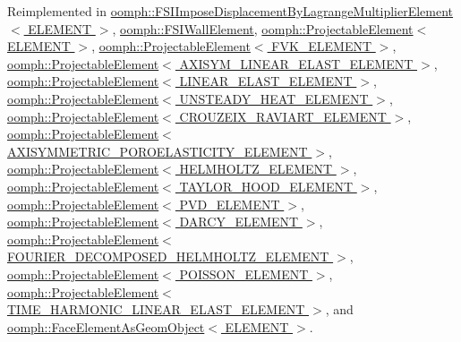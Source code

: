 Reimplemented in \hyperlink{classoomph_1_1FSIImposeDisplacementByLagrangeMultiplierElement_ad53849f509cfd0d3eb469bfacf7cfabf}{oomph\+::\+F\+S\+I\+Impose\+Displacement\+By\+Lagrange\+Multiplier\+Element$<$ E\+L\+E\+M\+E\+N\+T $>$}, \hyperlink{classoomph_1_1FSIWallElement_afe120348dddfc3acfd95e7d08c2d0a1d}{oomph\+::\+F\+S\+I\+Wall\+Element}, \hyperlink{classoomph_1_1ProjectableElement_a9e7e6d213f5e28d4b1e91433d4efb74c}{oomph\+::\+Projectable\+Element$<$ E\+L\+E\+M\+E\+N\+T $>$}, \hyperlink{classoomph_1_1ProjectableElement_a9e7e6d213f5e28d4b1e91433d4efb74c}{oomph\+::\+Projectable\+Element$<$ F\+V\+K\+\_\+\+E\+L\+E\+M\+E\+N\+T $>$}, \hyperlink{classoomph_1_1ProjectableElement_a9e7e6d213f5e28d4b1e91433d4efb74c}{oomph\+::\+Projectable\+Element$<$ A\+X\+I\+S\+Y\+M\+\_\+\+L\+I\+N\+E\+A\+R\+\_\+\+E\+L\+A\+S\+T\+\_\+\+E\+L\+E\+M\+E\+N\+T $>$}, \hyperlink{classoomph_1_1ProjectableElement_a9e7e6d213f5e28d4b1e91433d4efb74c}{oomph\+::\+Projectable\+Element$<$ L\+I\+N\+E\+A\+R\+\_\+\+E\+L\+A\+S\+T\+\_\+\+E\+L\+E\+M\+E\+N\+T $>$}, \hyperlink{classoomph_1_1ProjectableElement_a9e7e6d213f5e28d4b1e91433d4efb74c}{oomph\+::\+Projectable\+Element$<$ U\+N\+S\+T\+E\+A\+D\+Y\+\_\+\+H\+E\+A\+T\+\_\+\+E\+L\+E\+M\+E\+N\+T $>$}, \hyperlink{classoomph_1_1ProjectableElement_a9e7e6d213f5e28d4b1e91433d4efb74c}{oomph\+::\+Projectable\+Element$<$ C\+R\+O\+U\+Z\+E\+I\+X\+\_\+\+R\+A\+V\+I\+A\+R\+T\+\_\+\+E\+L\+E\+M\+E\+N\+T $>$}, \hyperlink{classoomph_1_1ProjectableElement_a9e7e6d213f5e28d4b1e91433d4efb74c}{oomph\+::\+Projectable\+Element$<$ A\+X\+I\+S\+Y\+M\+M\+E\+T\+R\+I\+C\+\_\+\+P\+O\+R\+O\+E\+L\+A\+S\+T\+I\+C\+I\+T\+Y\+\_\+\+E\+L\+E\+M\+E\+N\+T $>$}, \hyperlink{classoomph_1_1ProjectableElement_a9e7e6d213f5e28d4b1e91433d4efb74c}{oomph\+::\+Projectable\+Element$<$ H\+E\+L\+M\+H\+O\+L\+T\+Z\+\_\+\+E\+L\+E\+M\+E\+N\+T $>$}, \hyperlink{classoomph_1_1ProjectableElement_a9e7e6d213f5e28d4b1e91433d4efb74c}{oomph\+::\+Projectable\+Element$<$ T\+A\+Y\+L\+O\+R\+\_\+\+H\+O\+O\+D\+\_\+\+E\+L\+E\+M\+E\+N\+T $>$}, \hyperlink{classoomph_1_1ProjectableElement_a9e7e6d213f5e28d4b1e91433d4efb74c}{oomph\+::\+Projectable\+Element$<$ P\+V\+D\+\_\+\+E\+L\+E\+M\+E\+N\+T $>$}, \hyperlink{classoomph_1_1ProjectableElement_a9e7e6d213f5e28d4b1e91433d4efb74c}{oomph\+::\+Projectable\+Element$<$ D\+A\+R\+C\+Y\+\_\+\+E\+L\+E\+M\+E\+N\+T $>$}, \hyperlink{classoomph_1_1ProjectableElement_a9e7e6d213f5e28d4b1e91433d4efb74c}{oomph\+::\+Projectable\+Element$<$ F\+O\+U\+R\+I\+E\+R\+\_\+\+D\+E\+C\+O\+M\+P\+O\+S\+E\+D\+\_\+\+H\+E\+L\+M\+H\+O\+L\+T\+Z\+\_\+\+E\+L\+E\+M\+E\+N\+T $>$}, \hyperlink{classoomph_1_1ProjectableElement_a9e7e6d213f5e28d4b1e91433d4efb74c}{oomph\+::\+Projectable\+Element$<$ P\+O\+I\+S\+S\+O\+N\+\_\+\+E\+L\+E\+M\+E\+N\+T $>$}, \hyperlink{classoomph_1_1ProjectableElement_a9e7e6d213f5e28d4b1e91433d4efb74c}{oomph\+::\+Projectable\+Element$<$ T\+I\+M\+E\+\_\+\+H\+A\+R\+M\+O\+N\+I\+C\+\_\+\+L\+I\+N\+E\+A\+R\+\_\+\+E\+L\+A\+S\+T\+\_\+\+E\+L\+E\+M\+E\+N\+T $>$}, and \hyperlink{classoomph_1_1FaceElementAsGeomObject_a13703c5fac7edda661a3c5cd1f22b9fd}{oomph\+::\+Face\+Element\+As\+Geom\+Object$<$ E\+L\+E\+M\+E\+N\+T $>$}.



